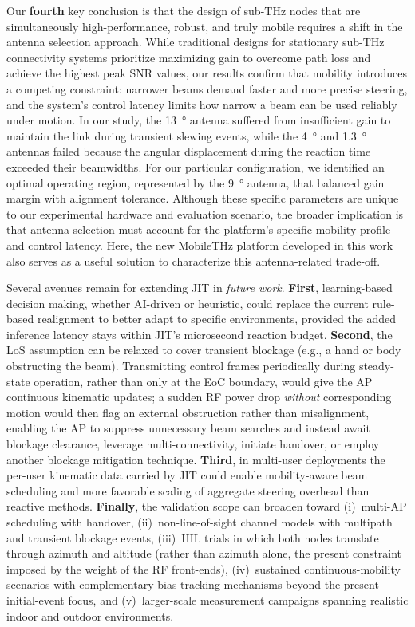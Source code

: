\documentclass[fleqn,10pt]{wlscirep}
\newcommand{\rev}[1]{{\color{revblue}#1}}
\begin{document}
Our \textbf{fourth} key conclusion is that the design of sub-THz nodes that are simultaneously high-performance, robust, and truly mobile requires a shift in the antenna selection approach. While traditional designs for stationary sub-THz connectivity systems prioritize maximizing gain to overcome path loss and achieve the highest peak SNR values, our results confirm that mobility introduces a competing constraint: narrower beams demand faster and more precise steering, and the system's control latency limits how narrow a beam can be used reliably under motion. In our study, the \SI{13}{\degree} antenna suffered from insufficient gain to maintain the link during transient slewing events, while the \SI{4}{\degree} and \SI{1.3}{\degree} antennas failed because the angular displacement during the reaction time exceeded their beamwidths. For our particular configuration, we identified an optimal operating region, represented by the \SI{9}{\degree} antenna, that balanced gain margin with alignment tolerance. Although these specific parameters are unique to our experimental hardware and evaluation scenario, the broader implication is that antenna selection must account for the platform's specific mobility profile and control latency. Here, the new MobileTHz platform developed in this work also serves as a useful solution to characterize this antenna-related trade-off.

Several avenues remain for extending JIT in \emph{future work}. \textbf{First}, learning-based decision making\cite{10036372}, whether AI-driven or heuristic, could replace the current rule-based realignment to better adapt to specific environments, \rev{provided the added inference latency stays within JIT's microsecond reaction budget}. \textbf{Second}, the LoS assumption can be relaxed to cover transient blockage (e.g., a hand or body obstructing the beam). Transmitting control frames periodically during steady-state operation, rather than only at the EoC boundary, would give the AP continuous kinematic updates; a sudden RF power drop \emph{without} corresponding motion would then flag an external obstruction rather than misalignment, enabling the AP to suppress unnecessary beam searches and instead await blockage clearance, leverage multi-connectivity, initiate handover, or employ another blockage mitigation technique. \textbf{Third}, in multi-user deployments the per-user kinematic data carried by JIT could enable mobility-aware beam scheduling and more favorable scaling of aggregate steering overhead than reactive methods. \rev{\textbf{Finally}, the validation scope can broaden toward (i)~multi-AP scheduling with handover, (ii)~non-line-of-sight channel models with multipath and transient blockage events, (iii)~HIL trials in which both nodes translate through azimuth and altitude (rather than azimuth alone, the present constraint imposed by the weight of the RF front-ends), (iv)~sustained continuous-mobility scenarios with complementary bias-tracking mechanisms beyond the present initial-event focus, and (v)~larger-scale measurement campaigns spanning realistic indoor and outdoor environments.}
\end{document}

